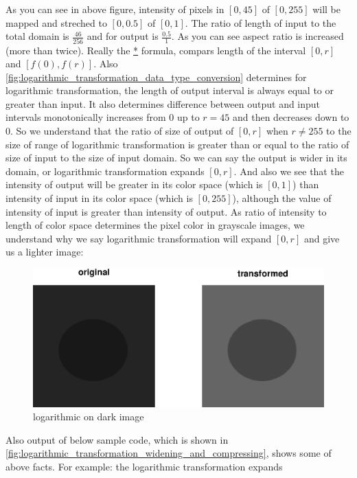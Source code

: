 \begin{enumerate}
    As you can see in above figure, intensity of pixels in $[0,45]$ of $[0,
    255]$ will be mapped and streched to $[0,0.5]$ of $[0,1]$. The ratio of
    length of input to the total domain is $\frac{46}{256}$ and for output is 
    $\frac{0.5}{1}$. As you can see aspect ratio is increased (more than twice).
    Really the \hyperref[relation:eq_1]{*} formula, compars length of the
    interval $[0,r]$ and $[f(0), f(r)]$. Also 
    \autoref{fig:logarithmic_transformation_data_type_conversion} determines for
    logarithmic transformation, the length of output interval is always equal to
    or greater than input. It also determines difference between output and
    input intervals monotonically increases from $0$ up to $r=45$ and then
    decreases down to $0$.  
So we understand that the ratio of size of output of $[0,r]$ when $r \not= 255$
to the size of range of logarithmic transformation is greater than or equal to
the ratio of size of input to the size of input domain. So we can say the output
is wider in its domain, or logarithmic transformation expands $[0,r]$. 
And also we see that the intensity of output will be greater in its
color space (which is $[0,1]$) than intensity of input in its color space (which
is $[0,255]$), although the value of intensity of input is greater than
intensity of output. As ratio of intensity to length of color space determines
the pixel color in grayscale images, we understand why we say logarithmic
transformation will expand $[0,r]$ and give us a lighter image:
\begin{figure}[htb!]
    \includegraphics[scale=0.4]{logarithmic_on_dark_image.eps}
    \centering
    \caption{logarithmic on dark image}
    \label{fig:logarithmic_on_dark_image}
\end{figure}
Also output of below sample code, which is shown in 
\autoref{fig:logarithmic_transformation_widening_and_compressing}, shows 
some of above facts. For example: the logarithmic transformation expands 

\end{enumerate}
